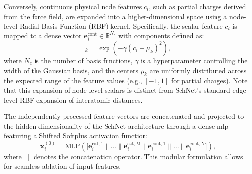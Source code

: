 Conversely, continuous physical node features $c_i$, such as partial charges derived from the force field, are expanded into a higher-dimensional space using a node-level Radial Basis Function (RBF) kernel. Specifically, the scalar feature $c_i$ is mapped to a dense vector $\mathbf{e}_i^{\mathrm{cont}} \in \mathbb{R}^{N_c}$ with components defined as:
\begin{equation}
    [\mathbf{e}_i^{\mathrm{cont}}]_k = \exp\left(-\gamma (c_i - \mu_k)^2\right),
\end{equation}
where $N_c$ is the number of basis functions, $\gamma$ is a hyperparameter controlling the width of the Gaussian basis, and the centers $\mu_k$ are uniformly distributed across the expected range of the feature values (e.g., $[-1, 1]$ for partial charges). Note that this expansion of node-level scalars is distinct from SchNet's standard edge-level RBF expansion of interatomic distances.

The independently processed feature vectors are concatenated and projected to the hidden dimensionality of the SchNet architecture through a dense \gls{mlp} featuring a Shifted Softplus activation function:
\begin{equation}
    \mathbf{x}_i^{(0)} = \mathrm{MLP} \left( \big[ \mathbf{e}_i^{\mathrm{cat, 1}} \parallel \dots \parallel \mathbf{e}_i^{\mathrm{cat, M}} \parallel \mathbf{e}_i^{\mathrm{cont, 1}} \parallel \dots \parallel \mathbf{e}_i^{\mathrm{cont, N}} \big] \right),
\end{equation}
where $\parallel$ denotes the concatenation operator. This modular formulation allows for seamless ablation of input features.

